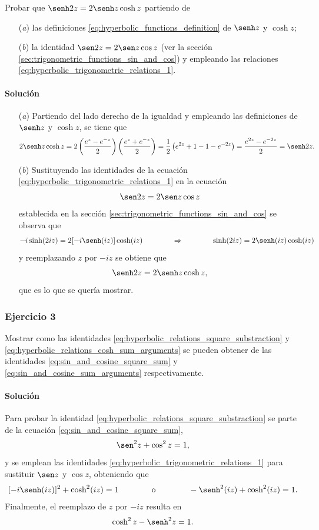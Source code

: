 \documentclass[a4paper]{report}
\begin{document}
Probar que \(\senh2z=2\senh z\cosh z\) partiendo de
\begin{enumerate}
 \item[(\textit{a})] las definiciones \ref{eq:hyperbolic_functions_definition} de \(\senh z\) y \(\cosh z\);
 \item[(\textit{b})] la identidad \(\sen2z=2\sen z\cos z\) (ver la sección \ref{sec:trigonometric_functions_sin_and_cos}) y empleando las relaciones \ref{eq:hyperbolic_trigonometric_relations_1}.
\end{enumerate}

\paragraph{Solución} 

\begin{enumerate}
 \item[(\textit{a})] Partiendo del lado derecho de la igualdad y empleando las definiciones de \(\senh z\) y \(\cosh z\), se tiene que
 \[
  2\senh z\cosh z=2\left(\frac{e^z-e^{-z}}{2}\right)\left(\frac{e^z+e^{-z}}{2}\right)
  =\frac{1}{2}\left(e^{2z}+1-1-e^{-2z}\right)=\frac{e^{2z}-e^{-2z}}{2}=\senh2z.
 \]
 \item[(\textit{b})] Sustituyendo las identidades de la ecuación \ref{eq:hyperbolic_trigonometric_relations_1} en la ecuación
 \[
  \sen2z=2\sen z\cos z
 \]
 establecida en la sección \ref{sec:trigonometric_functions_sin_and_cos} se observa que 
 \[
  -i\sinh(2iz)=2[-i\senh(iz)]\cosh(iz)
  \qquad\qquad\Rightarrow\qquad\qquad
  \sinh(2iz)=2\senh(iz)\cosh(iz)
 \]
 y reemplazando \(z\) por \(-iz\) se obtiene que 
 \[
  \senh2z=2\senh z\cosh z,
 \]
 que es lo que se quería mostrar.
\end{enumerate}

\subsubsection{Ejercicio 3}

Mostrar como las identidades \ref{eq:hyperbolic_relations_square_substraction} y \ref{eq:hyperbolic_relations_cosh_sum_arguments} se pueden obtener de las identidades \ref{eq:sin_and_cosine_square_sum} y \ref{eq:sin_and_cosine_sum_arguments} respectivamente.

\paragraph{Solución} Para probar la identidad \ref{eq:hyperbolic_relations_square_substraction} se parte de la ecuación \ref{eq:sin_and_cosine_square_sum},
\[
 \sen^2z+\cos^2z=1,
\]
y se emplean las identidades \ref{eq:hyperbolic_trigonometric_relations_1} para sustituir \(\sen z\) y \(\cos z\), obteniendo que 
\[
 [-i\senh(iz)]^2+\cosh^2(iz)=1
 \qquad\qquad\textrm{o}\qquad\qquad
 -\senh^2(iz)+\cosh^2(iz)=1.
\]
Finalmente, el reemplazo de \(z\) por \(-iz\) resulta en
\[
 \cosh^2z-\senh^2z=1.
\]
\end{document}
